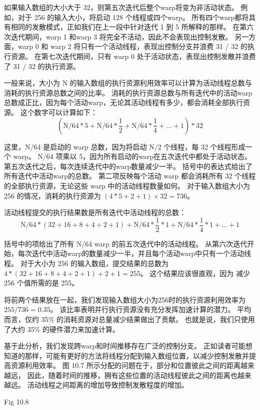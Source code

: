 如果输入数组的大小大于 32，则第五次迭代后整个warp将变为非活动状态。 
例如，对于 256 的输入大小，将启动 128 个线程或四个warp。 
所有四个warp都将具有相同的发散模式，正如我们在上一段中针对迭代 1 到 5 所解释的那样。
在第六次迭代期间，warp 1 和warp 3 将完全不活动，因此不会表现出控制发散。 
另一方面，warp 0 和 warp 2 将只有一个活动线程，表现出控制分支并浪费 31 / 32 的执行资源。 
在第七次迭代期间，只有 warp 0 处于活动状态，表现出控制发散并浪费了 31 / 32 的执行资源。

一般来说，大小为 N 的输入数组的执行资源利用效率可以计算为活动线程总数与消耗的执行资源总数之间的比率。 
消耗的执行资源总数与所有迭代中的活动warp总数成正比，因为每个活动warp，无论其活动线程有多少，都会消耗全部执行资源。 
这个数字可以计算如下：
$$
\left(\mathrm{N} / 64 * 5+\mathrm{N} / 64 * \frac{1}{2} +\mathrm{N} / 64*\frac{1}{4} +\ldots+1\right) * 32
$$

这里，N/64 是启动的 warp 总数，因为将启动 N/2 个线程，每 32 个线程形成一个 warp。 
N/64 项乘以 5，因为所有启动的warp在五次迭代中都处于活动状态。 第五次迭代之后，每次连续迭代中的warp数量减少一半。 
括号中的表达式给出了所有迭代中活动warp的总数。 
第二项反映每个活动 warp 都会消耗所有 32 个线程的全部执行资源，无论这些 warp 中的活动线程数量如何。 
对于输入数组大小为 256 的情况，消耗的执行资源为 $(4 * 5+2+1) × 32 = 736$。

活动线程提交的执行结果数是所有迭代中活动线程的总数：
$$
\mathrm{N} / 64 * (32+16+8+4+2+1)+\mathrm{N} / 64*\frac{1}{2} * 1+\mathrm{N} / 64* \frac{1}{4}* 1+\ldots+1
$$

括号中的项给出了所有 N/64 warp 的前五次迭代中的活动线程。 
从第六次迭代开始，每次迭代中活动warp的数量减少一半，并且每个活动warp中只有一个活动线程。 
对于大小为 256 的输入数组，提交结果的总数为 $4*(32+16+8+4+2+1)+2+1 = 255$。
这个结果应该很直观，因为 减少 256 个值所需的是 255。

将前两个结果放在一起，我们发现输入数组大小为256时的执行资源利用效率为 $255/736 = 0.35$。 
该比率表明并行执行资源没有充分发挥加速计算的潜力。 平均而言，仅约 35\% 的消耗资源对总量减少结果做出了贡献。 
也就是说，我们只使用了大约 35\% 的硬件潜力来加速计算。

基于此分析，我们发现跨warp和时间推移存在广泛的控制分支。 
正如读者可能想知道的那样，可能有更好的方法将线程分配到输入数组位置，以减少控制发散并提高资源利用效率。 
图 10.7 所示分配的问题在于，部分和位置彼此之间的距离越来越远，
因此，随着时间的推移，拥有这些位置的活动线程彼此之间的距离也越来越远。 活动线程之间距离的增加导致控制发散程度的增加。

{\color{red} Fig 10.8}

